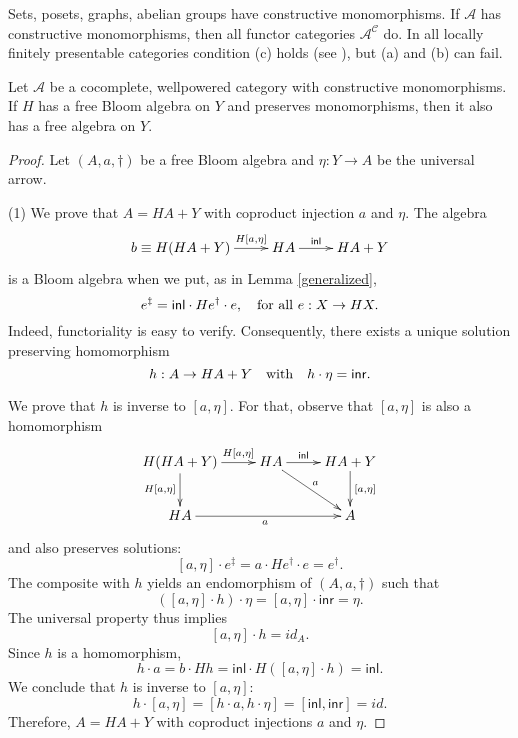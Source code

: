 \documentclass{LMCS}
\theoremstyle{plain}
\theoremstyle{definition}
\numberwithin{equation}{section}
\begin{document}
\begin{exa}
Sets, posets, graphs, abelian groups have constructive monomorphisms. If $\mathcal A$ has constructive monomorphisms, then all functor categories $\mathcal A^{\mathcal C}$ do. In all locally finitely presentable categories condition (c) holds (see \cite{ar}), but (a) and (b) can fail.
\end{exa}

\begin{prop}\label{free B then free alg}
Let $\mathcal A$ be a cocomplete, wellpowered category with constructive monomorphisms. If $H$ has a free Bloom algebra on $Y$ and preserves monomorphisms, then it also has a free algebra on $Y$.
\end{prop}

\begin{proof}
Let $(A,a,\dagger)$ be a free Bloom algebra and $\eta:Y\rightarrow A$ be the universal arrow.\medskip

\noindent (1) We prove that $A=HA+Y$ with coproduct injection $a$ and $\eta$. The algebra
$$\xymatrix{b\equiv H(HA+Y)\ar[r]^-{H[a,\eta]}& HA\ar[r]^-{\mathsf{inl}}&HA+Y}$$
is a Bloom algebra when we put, as in Lemma \ref{generalized},
$$e^\ddag=\mathsf{inl}\cdot He^\dag\cdot e, \ \ \ {\rm for\ all\ } e:X\rightarrow HX.$$
Indeed, functoriality is easy to verify. Consequently, there exists a unique solution preserving homomorphism
$$h:A\rightarrow HA+Y\ \ \ {\rm with}\ \ \ h\cdot \eta=\mathsf{inr}.$$

\noindent We prove that $h$ is inverse to $[a,\eta]$. For that, observe that $[a,\eta]$ is also a homomorphism
$$
\xymatrix{
H(HA+Y)\ar[d]_{H[a,\eta]}\ar[r]^-{H[a,\eta]}&HA\ar[r]^-{\mathsf{inl}}\ar[rd]^a&HA+Y\ar[d]^{[a,\eta]}\\
HA\ar[rr]_a&&A
}
$$
and also preserves solutions:
$$[a,\eta]\cdot e^\ddag=a\cdot He^\dag\cdot e=e^\dag.$$
The composite with $h$ yields an endomorphism of $(A,a,\dagger)$ such that
$$ ([a,\eta]\cdot h)\cdot \eta=[a,\eta]\cdot \mathsf{inr}=\eta.$$
The universal property thus implies
$$[a,\eta]\cdot h=id_A.$$
Since $h$ is a homomorphism, 
$$h\cdot a=b\cdot Hh=\mathsf{inl}\cdot H([a,\eta]\cdot h)=\mathsf{inl}.$$
We conclude that $h$ is inverse to $[a,\eta]$:
$$h\cdot [a,\eta]=[h\cdot a,h\cdot\eta]=[\mathsf{inl},\mathsf{inr}]=id.$$
Therefore, $A=HA+Y$ with coproduct injections $a$ and $\eta$.\medskip


\end{proof}
\end{document}
